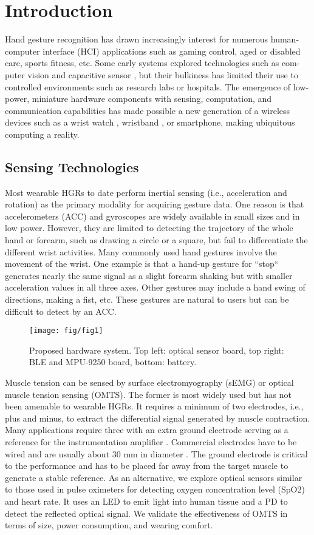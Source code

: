 \section{Introduction}
Hand gesture recognition has drawn increasingly interest
for numerous human-computer interface (HCI) applications
such as gaming control, aged or disabled care, sports fitness,
etc. Some early systems explored technologies such as com-
puter vision and capacitive sensor \cite{c1,c2,c3}, but their bulkiness
has limited their use to controlled environments \cite{c4} such
as research labs or hospitals. The emergence of low-power,
miniature hardware components with sensing, computation,
and communication capabilities has made possible a new
generation of a wireless devices such as a wrist watch \cite{c5},
wristband \cite{c6}, or smartphone, making ubiquitous computing a
reality.
\subsection{Sensing Technologies}
Most wearable HGRs to date perform inertial sensing (i.e.,
acceleration and rotation) as the primary modality for acquiring
gesture data. One reason is that accelerometers (ACC) and
gyroscopes are widely available in small sizes and in low
power. However, they are limited to detecting the trajectory
of the whole hand or forearm, such as drawing a circle or a
square, but fail to differentiate the different wrist activities.
Many commonly used hand gestures involve the movement of
the wrist. One example is that a hand-up gesture for ``stop``
generates nearly the same signal as a slight forearm shaking
but with smaller acceleration values in all three axes. Other
gestures may include a hand swing of directions, making a
fist, etc. These gestures are natural to users but can be difficult
to detect by an ACC.

\begin{figure}[t]
\centering
\texttt{[image: fig/fig1]}
\caption{Proposed hardware system. Top left: optical sensor
board, top right: BLE and MPU-9250 board, bottom: battery.}
\end{figure}


Muscle tension can be sensed by surface electromyography
(sEMG) or optical muscle tension sensing (OMTS). The former
is most widely used but has not been amenable to wearable
HGRs. It requires a minimum of two electrodes, i.e., plus and
minus, to extract the differential signal generated by muscle
contraction. Many applications require three with an extra
ground electrode serving as a reference for the instrumentation
amplifier \cite{c7}. Commercial electrodes have to be wired and are
usually about 30 mm in diameter \cite{c8}. The ground electrode
is critical to the performance and has to be placed far away
from the target muscle to generate a stable reference. As an
alternative, we explore optical sensors similar to those used
in pulse oximeters for detecting oxygen concentration level
(SpO2) \cite{c9} and heart rate. It uses an LED to emit light into
human tissue and a PD to detect the reflected optical signal.
We validate the effectiveness of OMTS in terms of size, power
consumption, and wearing comfort.

